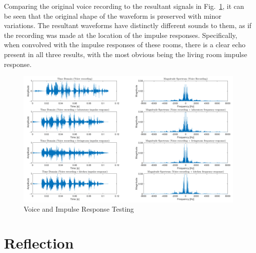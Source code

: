\documentclass[12pt]{article}
\numberwithin{equation}{section}
\numberwithin{figure}{section}
\numberwithin{table}{section}
\begin{document}
Comparing the original voice recording to the resultant signals in
Fig.~\ref{fig:p3-voicetest}, it can be seen that the original shape of the
waveform is preserved with minor variations. The resultant waveforms have
distinctly different sounds to them, as if the recording was made at the
location of the impulse responses. Specifically, when convolved with the
impulse responses of these rooms, there is a clear echo present in all three
results, with the most obvious being the living room impulse response.

\begin{figure}[ht]
    \centering
    \includegraphics[width=\textwidth]{figures/p3-voicetest.png}
    \caption{Voice and Impulse Response Testing\label{fig:p3-voicetest}}
\end{figure}

\section{Reflection}
\pagebreak
\end{document}

